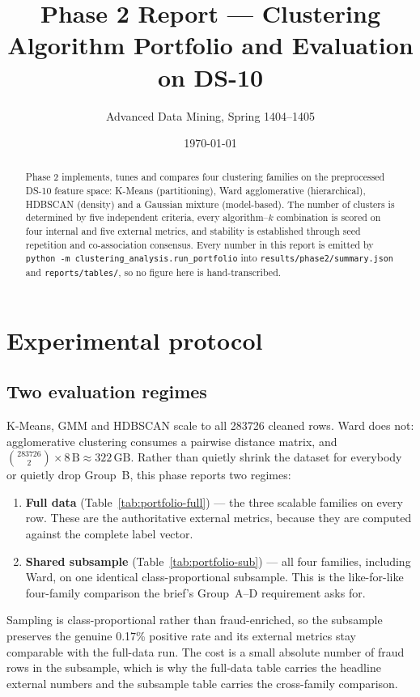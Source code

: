 \documentclass[11pt, a4paper]{article}
\title{\textbf{Phase 2 Report — Clustering Algorithm Portfolio and Evaluation on DS-10}}
\author{Advanced Data Mining, Spring 1404--1405}
\date{\today}
\providecommand{\num}[1]{#1}
\begin{document}
\maketitle

\begin{abstract}
\noindent
Phase 2 implements, tunes and compares four clustering families on the
preprocessed DS-10 feature space: K-Means (partitioning), Ward agglomerative
(hierarchical), HDBSCAN (density) and a Gaussian mixture (model-based). The
number of clusters is determined by five independent criteria, every
algorithm--$k$ combination is scored on four internal and five external metrics,
and stability is established through seed repetition and co-association
consensus. Every number in this report is emitted by
\texttt{python -m clustering\_analysis.run\_portfolio} into
\texttt{results/phase2/summary.json} and \texttt{reports/tables/}, so no figure
here is hand-transcribed.
\end{abstract}

\section{Experimental protocol}

\subsection{Two evaluation regimes}
K-Means, GMM and HDBSCAN scale to all \num{283726} cleaned rows. Ward does not:
agglomerative clustering consumes a pairwise distance matrix, and
$\binom{283726}{2}\times 8\,\mathrm{B} \approx 322\,\mathrm{GB}$. Rather than
quietly shrink the dataset for everybody or quietly drop Group~B, this phase
reports two regimes:

\begin{enumerate}
  \item \textbf{Full data} (Table~\ref{tab:portfolio-full}) --- the three
        scalable families on every row. These are the authoritative external
        metrics, because they are computed against the complete label vector.
  \item \textbf{Shared subsample} (Table~\ref{tab:portfolio-sub}) --- all four
        families, including Ward, on one identical class-proportional
        subsample. This is the like-for-like four-family comparison the brief's
        Group~A--D requirement asks for.
\end{enumerate}

Sampling is class-proportional rather than fraud-enriched, so the subsample
preserves the genuine \num{0.17}\% positive rate and its external metrics stay
comparable with the full-data run. The cost is a small absolute number of fraud
rows in the subsample, which is why the full-data table carries the headline
external numbers and the subsample table carries the cross-family comparison.
\end{document}
